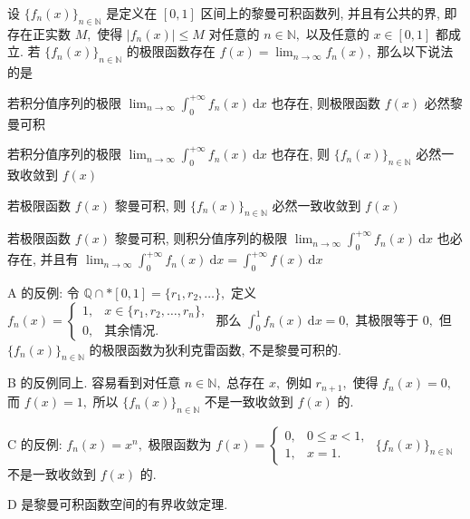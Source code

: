 \begin{question}
设 $\{f_n(x)\}_{n\in\mathbb{N}}$ 是定义在 $[0, 1]$ 区间上的黎曼可积函数列, 并且有公共的界, 即存在正实数 $M,$ 使得 $|f_n(x)| \leqslant M$ 对任意的 $n \in \mathbb{N},$ 以及任意的 $x \in [0, 1]$ 都成立. 若 $\{f_n(x)\}_{n\in\mathbb{N}}$ 的极限函数存在 $\displaystyle f(x) = \lim_{n\to\infty} f_n(x),$ 那么以下说法的是 \paren[D]

\begin{choices}
\item 若积分值序列的极限 $\displaystyle \lim_{n\to\infty} \int_0^{+\infty} f_n(x) ~ \mathrm{d}x$ 也存在, 则极限函数 $f(x)$ 必然黎曼可积
\item 若积分值序列的极限 $\displaystyle \lim_{n\to\infty} \int_0^{+\infty} f_n(x) ~ \mathrm{d}x$ 也存在, 则 $\{f_n(x)\}_{n\in\mathbb{N}}$ 必然一致收敛到 $f(x)$
\item 若极限函数 $f(x)$ 黎曼可积, 则 $\{f_n(x)\}_{n\in\mathbb{N}}$ 必然一致收敛到 $f(x)$
\item 若极限函数 $f(x)$ 黎曼可积, 则积分值序列的极限 $\displaystyle \lim_{n\to\infty} \int_0^{+\infty} f_n(x) ~ \mathrm{d}x$ 也必存在, 并且有 $\displaystyle \lim_{n\to\infty} \int_0^{+\infty} f_n(x) ~ \mathrm{d}x = \int_0^{+\infty} f(x) ~ \mathrm{d}x$
\end{choices}
\end{question}

\begin{solution}
A 的反例: 令 $\mathbb{Q} \cap* [0, 1] = \{r_1, r_2, \dots\},$ 定义 $f_n(x) = \begin{cases}
1, & x \in \{r_1, r_2, \dots, r_n\},\\
0, & \text{其余情况}.
\end{cases}$ 那么 $\displaystyle \int_0^1 f_n(x) ~ \mathrm{d}x = 0,$ 其极限等于 $0,$ 但 $\{f_n(x)\}_{n\in\mathbb{N}}$ 的极限函数为狄利克雷函数, 不是黎曼可积的.

B 的反例同上. 容易看到对任意 $n \in \mathbb{N},$ 总存在 $x,$ 例如 $r_{n+1},$ 使得 $f_n(x) = 0,$ 而 $f(x) = 1,$ 所以 $\{f_n(x)\}_{n\in\mathbb{N}}$ 不是一致收敛到 $f(x)$ 的.

C 的反例: $f_n(x) = x^n,$ 极限函数为 $f(x) = \begin{cases}
0, & 0 \leqslant x < 1, \\
1, & x = 1.
\end{cases}$ $\{f_n(x)\}_{n\in\mathbb{N}}$ 不是一致收敛到 $f(x)$ 的.

D 是黎曼可积函数空间的有界收敛定理.
\end{solution}

